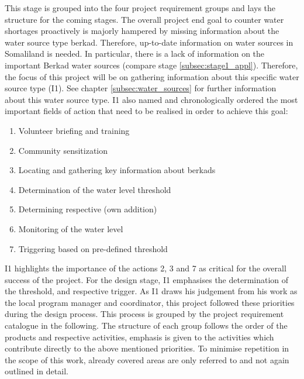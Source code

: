 This stage is grouped into the four project requirement groups and lays the structure for the coming stages. The overall project end goal to counter water shortages proactively is majorly hampered by missing information about the water source type berkad. Therefore, up-to-date information on water sources in Somaliland is needed. In particular, there is a lack of information on the important Berkad water sources (compare stage \ref*{subsec:stage1_appl}). Therefore, the focus of this project will be on gathering information about this specific water source type (I1). See chapter \ref*{subsec:water_sources} for further information about this water source type. I1 also named and chronologically ordered the most important fields of action that need to be realised in order to achieve this goal:

\begin{enumerate}
    \item Volunteer briefing and training
    \item Community sensitization
    \item Locating and gathering key information about berkads
    \item Determination of the water level threshold 
    \item Determining respective  (own addition)
    \item Monitoring of the water level
    \item Triggering  based on pre-defined threshold    
\end{enumerate}

I1 highlights the importance of the actions 2, 3 and 7 as critical for the overall success of the project. For the design stage, I1 emphasises the determination of the threshold,  and respective trigger. As I1 draws his judgement from his work as the local program manager and coordinator, this project followed these priorities during the design process. This process is grouped by the project requirement catalogue in the following. The structure of each group follows the order of the products and respective activities, emphasis is given to the activities which contribute directly to the above mentioned priorities. To minimise repetition in the scope of this work, already covered areas are only referred to and not again outlined in detail. 


